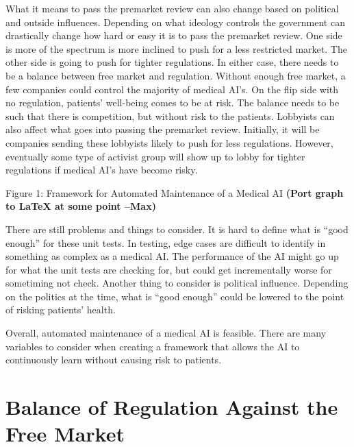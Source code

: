 \documentclass[]{article}
\begin{document}
		What it means to pass the premarket review can also change based on political and outside influences. Depending on what ideology controls the government can drastically change how hard or easy it is to pass the premarket review. One side is more of the spectrum is more inclined to push for a less restricted market. The other side is going to push for tighter regulations. In either case, there needs to be a balance between free market and regulation. Without enough free market, a few companies could control the majority of medical AI’s. On the flip side with no regulation, patients’ well-being comes to be at risk. The balance needs to be such that there is competition, but without risk to the patients. Lobbyists can also affect what goes into passing the premarket review. Initially, it will be companies sending these lobbyists likely to push for less regulations. However, eventually some type of activist group will show up to lobby for tighter regulations if medical AI’s have become risky.

		Figure 1: Framework for Automated Maintenance of a Medical AI \textbf{(Port graph to LaTeX at some point --Max)}

		There are still problems and things to consider. It is hard to define what is “good enough” for these unit tests. In testing, edge cases are difficult to identify in something as complex as a medical AI. The performance of the AI might go up for what the unit tests are checking for, but could get incrementally worse for sometiming not check. Another thing to consider is political influence. Depending on the politics at the time, what is “good enough” could be lowered to the point of risking patients’ health.
	
		Overall, automated maintenance of a medical AI is feasible. There are many variables to consider when creating a framework that allows the AI to continuously learn without causing risk to patients. 

	\section{Balance of Regulation Against the Free Market}

\medskip



		
\end{document}
